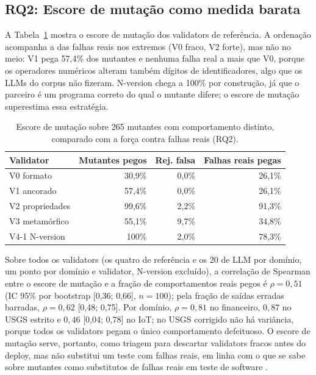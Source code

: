 \documentclass[sigconf,nonacm]{acmart}
\begin{document}
\subsection{RQ2: Escore de mutação como medida barata}

A Tabela~\ref{tab:rq2} mostra o escore de mutação dos validators de referência. A ordenação acompanha a das falhas reais nos extremos (V0 fraco, V2 forte), mas não no meio: V1 pega 57,4\% dos mutantes e nenhuma falha real a mais que V0, porque os operadores numéricos alteram também dígitos de identificadores, algo que os LLMs do corpus não fizeram. N-version chega a 100\% por construção, já que o parceiro é um programa correto do qual o mutante difere; o escore de mutação superestima essa estratégia.

\begin{table}[t]
\caption{Escore de mutação sobre 265 mutantes com comportamento distinto, comparado com a força contra falhas reais (RQ2).}
\label{tab:rq2}
\small
\begin{tabular}{lrrr}
\toprule
Validator & Mutantes pegos & Rej. falsa & Falhas reais pegas \\
\midrule
V0 formato & 30,9\% & 0,0\% & 26,1\% \\
V1 ancorado & 57,4\% & 0,0\% & 26,1\% \\
V2 propriedades & 99,6\% & 2,2\% & 91,3\% \\
V3 metamórfico & 55,1\% & 9,7\% & 34,8\% \\
V4-1 N-version & 100\% & 2,0\% & 78,3\% \\
\bottomrule
\end{tabular}
\end{table}

Sobre todos os validators (os quatro de referência e os 20 de LLM por domínio, um ponto por domínio e validator, N-version excluído), a correlação de Spearman entre o escore de mutação e a fração de comportamentos reais pegos é $\rho = 0{,}51$ (IC 95\% por bootstrap [0,36; 0,66], $n = 100$); pela fração de saídas erradas barradas, $\rho = 0{,}62$ [0,48; 0,75]. Por domínio, $\rho = 0{,}81$ no financeiro, $0{,}87$ no USGS estrito e $0{,}46$ [0,04; 0,78] no IoT; no USGS corrigido não há variância, porque todos os validators pegam o único comportamento defeituoso. O escore de mutação serve, portanto, como triagem para descartar validators fracos antes do deploy, mas não substitui um teste com falhas reais, em linha com o que se sabe sobre mutantes como substitutos de falhas reais em teste de software \cite{just2014mutants}.
\end{document}

